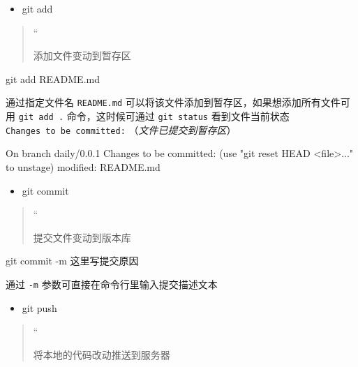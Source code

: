 \documentclass[
]{article}
\newenvironment{Shaded}{}{}
\newcommand{\NormalTok}[1]{#1}
\begin{document}
\begin{itemize}
\item
  git add
\end{itemize}

\begin{quote}
``

添加文件变动到暂存区
\end{quote}

\begin{Shaded}
\begin{Highlighting}[]
\NormalTok{git add README.md}
\end{Highlighting}
\end{Shaded}

通过指定文件名 \texttt{README.md}
可以将该文件添加到暂存区，如果想添加所有文件可用 \texttt{git\ add\ .}
命令，这时候可通过 \texttt{git\ status} 看到文件当前状态
\texttt{Changes\ to\ be\ committed:} （\emph{文件已提交到暂存区}）

\begin{Shaded}
\begin{Highlighting}[]
\NormalTok{On branch daily/0.0.1}
\NormalTok{Changes to be committed:}
\NormalTok{  (use "git reset HEAD \textless{}file\textgreater{}..." to unstage)}
\NormalTok{    modified:   README.md}
\end{Highlighting}
\end{Shaded}

\begin{itemize}
\item
  git commit
\end{itemize}

\begin{quote}
``

提交文件变动到版本库
\end{quote}

\begin{Shaded}
\begin{Highlighting}[]
\NormalTok{git commit {-}m \textquotesingle{}这里写提交原因\textquotesingle{}}
\end{Highlighting}
\end{Shaded}

通过 \texttt{-m} 参数可直接在命令行里输入提交描述文本

\begin{itemize}
\item
  git push
\end{itemize}

\begin{quote}
``

将本地的代码改动推送到服务器
\end{quote}
\end{document}
